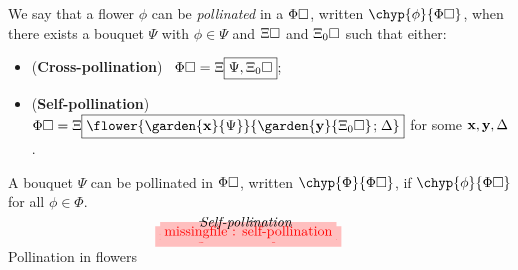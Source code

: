 \begin{scope}
\begin{definition}[Pollination]
  We say that a flower $\phi$ can be \emph{pollinated} in a  $\Phi\square$,
  written $\chyp{\phi}{\Phi\hole}$, when there exists a bouquet $\Psi$ with
  $\phi \in \Psi$ and  $\Xi\square$ and $\Xi_0\square$ such that either:
  \begin{itemize}
    \item (\textbf{Cross-pollination})~ $\Phi\square = \Xi\fbox{$\Psi,
    \Xi_0\square$}$;
    \item (\textbf{Self-pollination})~ $\Phi\hole =
    \cfill{\Xi}{\flower{\garden{\bx}{\Psi}}{\garden{\by}{\Xi_0\hole}
    \sep \Delta}}$ for some $\mathbf{x}, \mathbf{y}, \Delta$.
  \end{itemize}
  A bouquet $\Psi$ can be pollinated in $\Phi\square$, written
  $\chyp{\Phi}{\Phi\hole}$, if $\chyp{\phi}{\Phi\hole}$ for all $\phi \in \Phi$.
\end{definition}

\begin{marginfigure}
  $$
  \!\!\!\!
  \!\!\!\!
  \!\!\!\!
  \begin{array}{c}
    \tikzfig{1}{0.5}{cross-pollination} \vspace{-2em} \\
    \text{\textit{Cross-pollination}} \vspace{-1em} \\
    \tikzfig{1}{0.5}{self-pollination} \vspace{-2em} \\
    \text{\textit{Self-pollination}}
  \end{array}
  $$
  \caption{Pollination in flowers}
\end{marginfigure}


\end{scope}
